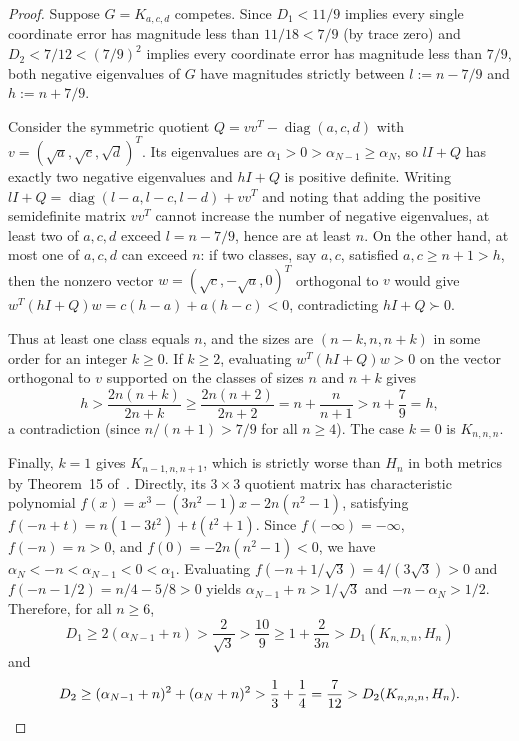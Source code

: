 \documentclass[10pt]{article}
\begin{document}
\begin{proof}
Suppose $G = K_{a,c,d}$ competes. Since $D_1 < 11/9$ implies every single coordinate error has magnitude less than $11/18 < 7/9$ (by trace zero) and $D_2 < 7/12 < (7/9)^2$ implies every coordinate error has magnitude less than $7/9$, both negative eigenvalues of $G$ have magnitudes strictly between $l := n - 7/9$ and $h := n + 7/9$.

Consider the symmetric quotient $Q = vv^T - \operatorname{diag}(a, c, d)$ with $v = (\sqrt{a}, \sqrt{c}, \sqrt{d})^T$. Its eigenvalues are $\alpha_1 > 0 > \alpha_{N-1} \geq \alpha_N$, so $lI + Q$ has exactly two negative eigenvalues and $hI + Q$ is positive definite. Writing $lI + Q = \operatorname{diag}(l - a, l - c, l - d) + vv^T$ and noting that adding the positive semidefinite matrix $vv^T$ cannot increase the number of negative eigenvalues, at least two of $a, c, d$ exceed $l = n - 7/9$, hence are at least $n$. On the other hand, at most one of $a, c, d$ can exceed $n$: if two classes, say $a, c$, satisfied $a, c \geq n + 1 > h$, then the nonzero vector $w = (\sqrt{c}, -\sqrt{a}, 0)^T$ orthogonal to $v$ would give $w^T(hI + Q)w = c(h - a) + a(h - c) < 0$, contradicting $hI + Q \succ 0$.

Thus at least one class equals $n$, and the sizes are $(n - k, n, n + k)$ in some order for an integer $k \geq 0$. If $k \geq 2$, evaluating $w^T(hI + Q)w > 0$ on the vector orthogonal to $v$ supported on the classes of sizes $n$ and $n + k$ gives
\[
h > \frac{2n(n + k)}{2n + k} \geq \frac{2n(n + 2)}{2n + 2} = n + \frac{n}{n + 1} > n + \frac{7}{9} = h,
\]
a contradiction (since $n/(n+1) > 7/9$ for all $n \geq 4$). The case $k = 0$ is $K_{n,n,n}$.

Finally, $k = 1$ gives $K_{n-1,n,n+1}$, which is strictly worse than $H_n$ in both metrics by Theorem~15 of~\cite{JSS2026}. Directly, its $3 \times 3$ quotient matrix has characteristic polynomial $f(x) = x^3 - (3n^2 - 1)x - 2n(n^2 - 1)$, satisfying $f(-n + t) = n(1 - 3t^2) + t(t^2 + 1)$. Since $f(-\infty) = -\infty$, $f(-n) = n > 0$, and $f(0) = -2n(n^2-1) < 0$, we have $\alpha_N < -n < \alpha_{N-1} < 0 < \alpha_1$. Evaluating $f(-n + 1/\sqrt{3}) = 4/(3\sqrt{3}) > 0$ and $f(-n - 1/2) = n/4 - 5/8 > 0$ yields $\alpha_{N-1} + n > 1/\sqrt{3}$ and $-n - \alpha_N > 1/2$. Therefore, for all $n \geq 6$,
\[
D_1 \geq 2(\alpha_{N-1} + n) > \frac{2}{\sqrt{3}} > \frac{10}{9} \geq 1 + \frac{2}{3n} > D_1(K_{n,n,n}, H_n)
\]
and
\[
D_2 \geq (\alpha_{N-1} + n)^2 + (\alpha_N + n)^2 > \frac{1}{3} + \frac{1}{4} = \frac{7}{12} > D_2(K_{n,n,n}, H_n).\qedhere
\]
\end{proof}
\end{document}
